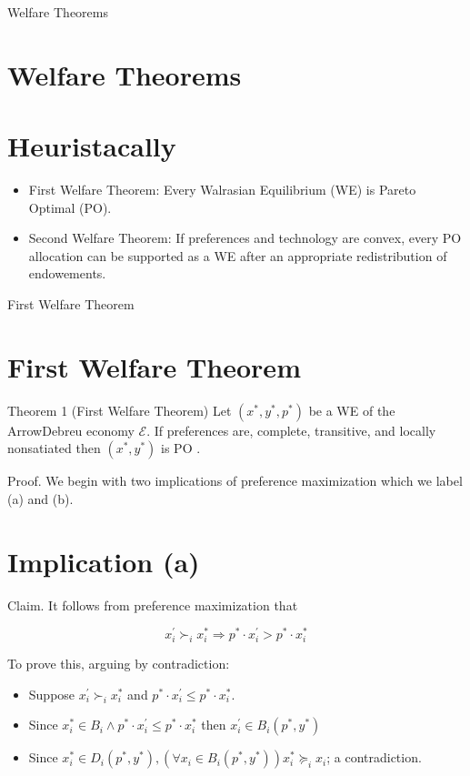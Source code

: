 \documentclass[10pt]{article}
\begin{document}
\captionsetup{singlelinecheck=false}
Welfare Theorems

\section*{Welfare Theorems}
\section*{Heuristacally}
\begin{itemize}
  \item First Welfare Theorem: Every Walrasian Equilibrium (WE) is Pareto Optimal (PO).
  \item Second Welfare Theorem: If preferences and technology are convex, every PO allocation can be supported as a WE after an appropriate redistribution of endowements.
\end{itemize}

First Welfare Theorem

\section*{First Welfare Theorem}
Theorem 1 (First Welfare Theorem) Let $\left(x^{*}, y^{*}, p^{*}\right)$ be a WE of the ArrowDebreu economy $\mathcal{E}$. If preferences are, complete, transitive, and locally nonsatiated then $\left(x^{*}, y^{*}\right)$ is PO .

Proof. We begin with two implications of preference maximization which we label (a) and (b).

\section*{Implication (a)}
Claim. It follows from preference maximization that

$$
x_{i}^{\prime} \succ_{i} x_{i}^{*} \Longrightarrow p^{*} \cdot x_{i}^{\prime}>p^{*} \cdot x_{i}^{*}
$$

To prove this, arguing by contradiction:

\begin{itemize}
  \item Suppose $x_{i}^{\prime} \succ_{i} x_{i}^{*}$ and $p^{*} \cdot x_{i}^{\prime} \leq p^{*} \cdot x_{i}^{*}$.
  \item Since $x_{i}^{*} \in B_{i} \wedge p^{*} \cdot x_{i}^{\prime} \leq p^{*} \cdot x_{i}^{*}$ then $x_{i}^{\prime} \in B_{i}\left(p^{*}, y^{*}\right)$
  \item Since $x_{i}^{*} \in D_{i}\left(p^{*}, y^{*}\right),\left(\forall x_{i} \in B_{i}\left(p^{*}, y^{*}\right)\right) x_{i}^{*} \succeq_{i} x_{i}$; a contradiction.
\end{itemize}
\end{document}

